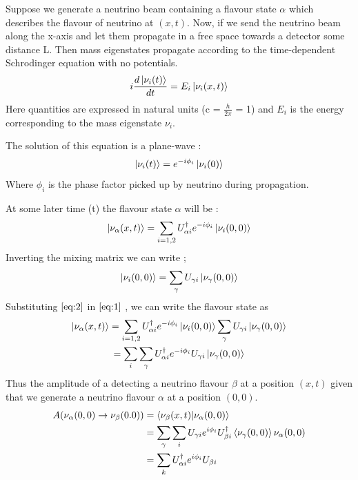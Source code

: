 \documentclass[12pt,a4paper]{report}
\begin{document}
Suppose we generate a neutrino beam containing a flavour state $\alpha$ which describes the flavour of neutrino at $(x,t)$. Now, if we send the neutrino beam along the x-axis and let them propagate in a free space towards a detector some distance L. Then mass eigenstates propagate according to the time-dependent Schrodinger equation with no potentials.
\begin{equation}
i\frac{d\ket{\nu_{i}(t)}}{dt}=E_{i}\ket{\nu_{i}(x,t)}
\end{equation}
Here quantities are expressed in natural units (c = $\frac{h}{2\pi}$ = 1) and $E_{i}$ is the energy corresponding to the mass eigenstate $\nu_{i}$.\par
The solution of this equation is a plane-wave : 
\begin{equation}
\label{eq:0}
\ket{\nu_{i} (t)} = e^{-i\phi_{i}}\ket{\nu_{i} (0)}
\end{equation}
Where $\phi_{i}$ is the phase factor picked up by neutrino during propagation.\par
At some later time (t) the flavour state $\alpha$ will be : 
\begin{equation}
\label{eq:1}
\ket{\nu_{\alpha}(x,t)} = \sum_{i=1,2} U_{\alpha i}^{\dagger} e^{-i\phi_{i}}\ket{\nu_{i}(0,0)}
\end{equation}
Inverting the mixing matrix we can write ;
\begin{equation}
\label{eq:2}
\ket{\nu_{i}(0,0)} = \sum_{\gamma} U_{\gamma i} \ket{\nu_{\gamma}(0,0)}
\end{equation}
Substituting $\ref{eq:2}$ in $\ref{eq:1}$ , we can write the flavour state as 
\begin{gather*}
\ket{\nu_{\alpha} (x,t)} =  \sum_{i=1,2} U_{\alpha i}^{\dagger}e^{-i\phi_{i}}\ket{\nu_{i}(0,0)}
\sum_{\gamma} U_{\gamma i} \ket{\nu_{\gamma}(0,0)}\\
 = \sum_{i}\sum_{\gamma} U_{\alpha i}^{\dagger} e^{-i\phi_{i}} U_{\gamma i} \ket{\nu_{\gamma}(0,0)}
\end{gather*}
Thus the amplitude of a detecting a neutrino flavour $\beta$ at a position $(x,t)$ given that we generate a neutrino flavour $\alpha$ at a position $(0,0)$.
\begin{equation}
\begin{split}
A(\nu_{\alpha} (0,0)\rightarrow\nu_{\beta}(0.0))& = \braket{\nu_{\beta}(x,t)|\nu_{\alpha}(0,0)}\\
& =\sum_{\gamma}\sum_{i} U_{\gamma i}e^{i\phi_{i}}U_{\beta i}^{\dagger}\braket{\nu_{\gamma}(0,0)}{\nu_{\alpha}(0,0)}\\
& =\sum_{k}U_{\alpha i}^{\dagger}e^{i\phi_{i}}U_{\beta i}
\end{split}
\end{equation}
\end{document}
